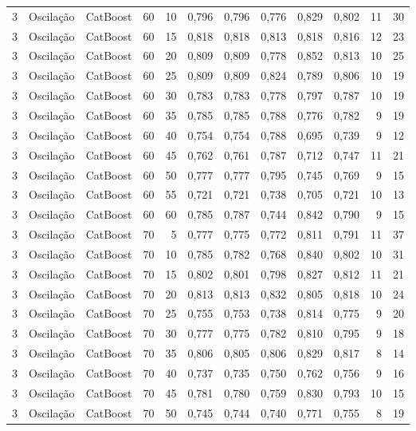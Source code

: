 \begin{longtable}{@{}rllrrrrrrrrr@{}}
3 & Oscilação & CatBoost & 60 & 10 & 0,796 & 0,796 & 0,776 & 0,829 & 0,802 & 11 & 30 \\
3 & Oscilação & CatBoost & 60 & 15 & 0,818 & 0,818 & 0,813 & 0,818 & 0,816 & 12 & 23 \\
3 & Oscilação & CatBoost & 60 & 20 & 0,809 & 0,809 & 0,778 & 0,852 & 0,813 & 10 & 25 \\
3 & Oscilação & CatBoost & 60 & 25 & 0,809 & 0,809 & 0,824 & 0,789 & 0,806 & 10 & 19 \\
3 & Oscilação & CatBoost & 60 & 30 & 0,783 & 0,783 & 0,778 & 0,797 & 0,787 & 10 & 19 \\
3 & Oscilação & CatBoost & 60 & 35 & 0,785 & 0,785 & 0,788 & 0,776 & 0,782 & 9 & 19 \\
3 & Oscilação & CatBoost & 60 & 40 & 0,754 & 0,754 & 0,788 & 0,695 & 0,739 & 9 & 12 \\
3 & Oscilação & CatBoost & 60 & 45 & 0,762 & 0,761 & 0,787 & 0,712 & 0,747 & 11 & 21 \\
3 & Oscilação & CatBoost & 60 & 50 & 0,777 & 0,777 & 0,795 & 0,745 & 0,769 & 9 & 15 \\
3 & Oscilação & CatBoost & 60 & 55 & 0,721 & 0,721 & 0,738 & 0,705 & 0,721 & 10 & 13 \\
3 & Oscilação & CatBoost & 60 & 60 & 0,785 & 0,787 & 0,744 & 0,842 & 0,790 & 9 & 15 \\
3 & Oscilação & CatBoost & 70 & 5 & 0,777 & 0,775 & 0,772 & 0,811 & 0,791 & 11 & 37 \\
3 & Oscilação & CatBoost & 70 & 10 & 0,785 & 0,782 & 0,768 & 0,840 & 0,802 & 10 & 31 \\
3 & Oscilação & CatBoost & 70 & 15 & 0,802 & 0,801 & 0,798 & 0,827 & 0,812 & 11 & 21 \\
3 & Oscilação & CatBoost & 70 & 20 & 0,813 & 0,813 & 0,832 & 0,805 & 0,818 & 10 & 24 \\
3 & Oscilação & CatBoost & 70 & 25 & 0,755 & 0,753 & 0,738 & 0,814 & 0,775 & 9 & 20 \\
3 & Oscilação & CatBoost & 70 & 30 & 0,777 & 0,775 & 0,782 & 0,810 & 0,795 & 9 & 18 \\
3 & Oscilação & CatBoost & 70 & 35 & 0,806 & 0,805 & 0,806 & 0,829 & 0,817 & 8 & 14 \\
3 & Oscilação & CatBoost & 70 & 40 & 0,737 & 0,735 & 0,750 & 0,762 & 0,756 & 9 & 16 \\
3 & Oscilação & CatBoost & 70 & 45 & 0,781 & 0,780 & 0,759 & 0,830 & 0,793 & 10 & 15 \\
3 & Oscilação & CatBoost & 70 & 50 & 0,745 & 0,744 & 0,740 & 0,771 & 0,755 & 8 & 19 \\

\end{longtable}
